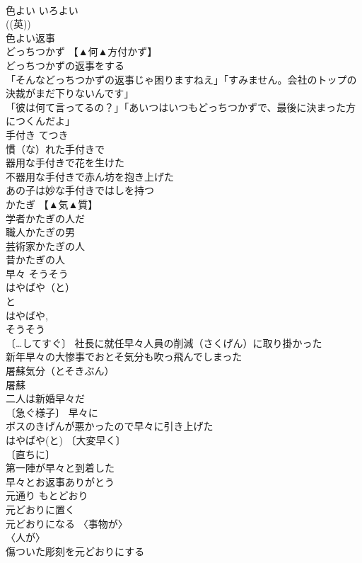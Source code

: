 \documentclass[8pt]{extreport}
\begin{document}
\begin{CJK}{UTF8}{min}
\\	色よい	いろよい	
\\	((英)) 
\\	色よい返事 
\\	どっちつかず	【▲何▲方付かず】	
\\	どっちつかずの返事をする 
\\	「そんなどっちつかずの返事じゃ困りますねえ」「すみません。会社のトップの決裁がまだ下りないんです」 
\\	「彼は何て言ってるの？」「あいつはいつもどっちつかずで、最後に決まった方につくんだよ」 
\\	手付き	てつき	
\\	慣（な）れた手付きで 
\\	器用な手付きで花を生けた 
\\	不器用な手付きで赤ん坊を抱き上げた 
\\	あの子は妙な手付きではしを持つ 
\\	かたぎ	【▲気▲質】	
\\	学者かたぎの人だ 
\\	職人かたぎの男 
\\	芸術家かたぎの人 
\\	昔かたぎの人 
\\	早々	そうそう 
\\	はやばや（と）	
\\	と 
\\	はやばや, 
\\	そうそう 
\\	〔…してすぐ〕 社長に就任早々人員の削減（さくげん）に取り掛かった 
\\	新年早々の大惨事でおとそ気分も吹っ飛んでしまった
\\	屠蘇気分（とそきぶん）　
\\	屠蘇 
\\	二人は新婚早々だ 
\\	〔急ぐ様子〕 早々に 
\\	ボスのきげんが悪かったので早々に引き上げた 
\\	はやばや(と) 〔大変早く〕
\\	〔直ちに〕
\\	第一陣が早々と到着した 
\\	早々とお返事ありがとう 
\\	元通り	もとどおり	
\\	元どおりに置く 
\\	元どおりになる 〈事物が〉 
\\	〈人が〉 
\\	傷ついた彫刻を元どおりにする 

\end{CJK}
\end{document}
